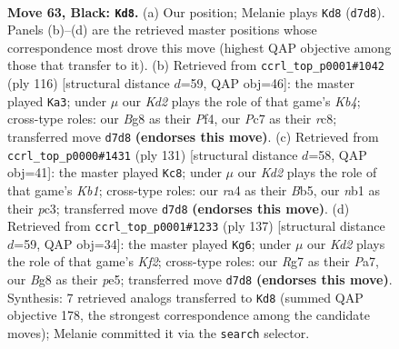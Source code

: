\documentclass[11pt]{article}
\begin{document}
\clearpage

\begin{figure}[p]\centering
\begin{subfigure}{0.46\textwidth}\centering
\resizebox{\linewidth}{!}{%
\newchessgame
\chessboard[
  setfen={1r4b1/p1pk2r1/P1p3p1/2P2p1p/RP3P1P/6R1/5K2/1N6 b - - 49 63},
  showmover=false,
  pgfstyle=straightmove, color=movearrow, markmove={d7-d8}
]}
\caption{}
\end{subfigure}\hfill
\begin{subfigure}{0.46\textwidth}\centering
\resizebox{\linewidth}{!}{%
\newchessgame
\chessboard[
  setfen={r1r5/3pk3/4p1p1/4P2p/PK1R1P1P/1P4R1/8/8 w - - 13 59},
  showmover=false,
  pgfstyle=straightmove, color=movearrow, markmove={b4-a3}
]}
\caption{}
\end{subfigure}
\\[4pt]
\begin{subfigure}{0.46\textwidth}\centering
\resizebox{\linewidth}{!}{%
\newchessgame
\chessboard[
  setfen={1k6/1r6/p3prp1/1b1p3p/2pP1P1P/2P2KP1/R1B5/R7 b - - 1 66},
  showmover=false,
  pgfstyle=straightmove, color=movearrow, markmove={b8-c8}
]}
\caption{}
\end{subfigure}\hfill
\begin{subfigure}{0.46\textwidth}\centering
\resizebox{\linewidth}{!}{%
\newchessgame
\chessboard[
  setfen={8/p4k2/r1p1p3/1p2Pp2/1P1P2p1/P1RK2P1/5P1r/5R2 b - - 7 69},
  showmover=false,
  pgfstyle=straightmove, color=movearrow, markmove={f7-g6}
]}
\caption{}
\end{subfigure}
\caption{\textbf{Move 63, Black: \texttt{Kd8}.} (a) Our position; Melanie plays \texttt{Kd8} (\texttt{d7d8}). Panels (b)--(d) are the retrieved master positions whose correspondence most drove this move (highest QAP objective among those that transfer to it). (b) Retrieved from \texttt{ccrl\_top\_p0001\#1042} (ply 116) [structural distance $d$=59, QAP obj=46]: the master played \texttt{Ka3}; under $\mu$ our \emph{Kd2} plays the role of that game's \emph{Kb4}; cross-type roles: our \emph{B}g8 as their \emph{P}f4, our \emph{P}c7 as their \emph{r}c8; transferred move \texttt{d7d8} \textbf{(endorses this move)}. (c) Retrieved from \texttt{ccrl\_top\_p0000\#1431} (ply 131) [structural distance $d$=58, QAP obj=41]: the master played \texttt{Kc8}; under $\mu$ our \emph{Kd2} plays the role of that game's \emph{Kb1}; cross-type roles: our \emph{r}a4 as their \emph{B}b5, our \emph{n}b1 as their \emph{p}c3; transferred move \texttt{d7d8} \textbf{(endorses this move)}. (d) Retrieved from \texttt{ccrl\_top\_p0001\#1233} (ply 137) [structural distance $d$=59, QAP obj=34]: the master played \texttt{Kg6}; under $\mu$ our \emph{Kd2} plays the role of that game's \emph{Kf2}; cross-type roles: our \emph{R}g7 as their \emph{P}a7, our \emph{B}g8 as their \emph{p}e5; transferred move \texttt{d7d8} \textbf{(endorses this move)}. Synthesis: 7 retrieved analogs transferred to \texttt{Kd8} (summed QAP objective 178, the strongest correspondence among the candidate moves); Melanie committed it via the \texttt{search} selector.}
\label{fig:thought-m125}
\end{figure}
\end{document}
